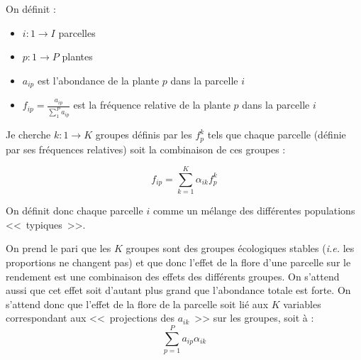 \documentclass[a4paper, 12pt]{article}
\begin{document}
On définit :

\begin{itemize}
  \item $ i : 1 \to I $ parcelles
  \item $ p : 1 \to P $ plantes
  \item $ a_{ip} $ est l'abondance de la plante $p$ dans la parcelle $i$
  \item $f_{ip} = \frac{a_{ip}}{\sum_{1}^{P} a_{ip}}$ est la fréquence relative
    de la plante $p$ dans la parcelle $i$
\end{itemize}

Je cherche $ k: 1 \to K $ groupes définis par les $ f^{k}_{p} $ tels que chaque
parcelle (définie par ses fréquences relatives) soit la combinaison de ces
groupes :

\[
  f_{ip} = \sum_{k=1}^{K} \alpha _{ik}f_{p}^{k}
\]

On définit donc chaque parcelle $i$ comme un mélange des différentes populations
<<~typiques~>>.

On prend le pari que les $K$ groupes sont des groupes écologiques stables
(\textit{i.e.} les proportions ne changent pas) et que donc l'effet de la flore
d'une parcelle sur le rendement est une combinaison des effets des différents
groupes.
On s'attend aussi que cet effet soit d'autant plus grand que l'abondance totale
est forte.
On s'attend donc que l'effet de la flore de la parcelle soit lié aux $K$
variables correspondant aux <<~projections des $a_{ik}$~>> sur les groupes, soit
à :
\[
  \sum_{p=1}^{P} a_{ip} \alpha _{ik}
\]
\end{document}
